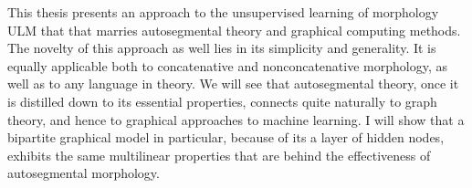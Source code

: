 This thesis presents an approach to the unsupervised learning of morphology \ac{ULM} that 
that marries autosegmental theory \citep{mccarthy:1981} and graphical 
computing methods. The novelty of this approach as well %
lies in its simplicity and generality. It is equally applicable both to concatenative and 
nonconcatenative morphology, as well as to any language in theory. We will see that
autosegmental theory, once it is distilled down to its essential properties, 
connects quite naturally to graph theory, and hence to graphical approaches 
to machine learning. I will show that a bipartite graphical model in particular, 
because of its a layer of hidden nodes, exhibits the same multilinear properties 
that are behind the effectiveness of autosegmental morphology. 

%
%

